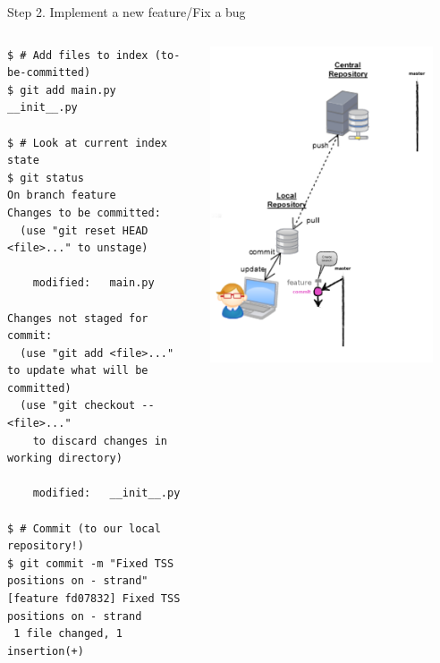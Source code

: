 \begin{frame}[fragile]{Step 2. Implement a new feature/Fix a bug}
\begin{columns}
	\begin{column}{0.6\textwidth}
	\begin{lstlisting}
$ # Add files to index (to-be-committed)
$ git add main.py __init__.py 

$ # Look at current index state
$ git status
On branch feature
Changes to be committed:
  (use "git reset HEAD <file>..." to unstage)

	modified:   main.py

Changes not staged for commit:
  (use "git add <file>..." to update what will be committed)
  (use "git checkout -- <file>..." 
	to discard changes in working directory)

	modified:   __init__.py 

$ # Commit (to our local repository!)
$ git commit -m "Fixed TSS positions on - strand"
[feature fd07832] Fixed TSS positions on - strand
 1 file changed, 1 insertion(+)
  	\end{lstlisting}
  	\end{column}
	\begin{column}{0.4\textwidth}
		\begin{center}
			\includegraphics[width=0.9\textwidth]{branch_commit.png}
		\end{center}
	\end{column}
\end{columns}
\end{frame}


